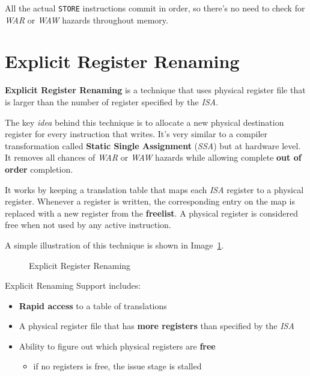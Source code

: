 \documentclass[english]{article}
\begin{document}
All the actual \texttt{STORE} instructions commit in order, so there's no need to check for \textit{WAR} or \textit{WAW} hazards throughout memory.

\newpage

\section{Explicit Register Renaming}

\textbf{Explicit Register Renaming} is a technique that uses physical register file that is larger than the number of register specified by the \textit{ISA}.

The key \textit{idea} behind this technique is to allocate a new physical destination register for every instruction that writes.
It's very similar to a compiler transformation called \textbf{Static Single Assignment} (\textit{SSA}) but at hardware level.
It removes all chances of \textit{WAR} or \textit{WAW} hazards while allowing complete \textbf{out of order} completion.

It works by keeping a translation table that maps each \textit{ISA} register to a physical register.
Whenever a register is written, the corresponding entry on the map is replaced with a new register from the \textbf{freelist}.
A physical register is considered free when not used by any active instruction.

A simple illustration of this technique is shown in Image~\ref{fig:explicit-register-renaming}.

\begin{figure}[htbp]
  \bigskip
  \centering
  \caption{Explicit Register Renaming}
  \label{fig:explicit-register-renaming}
  \bigskip
\end{figure}

Explicit Renaming Support includes:

\begin{itemize}
  \item \textbf{Rapid access} to a table of translations
  \item A physical register file that has \textbf{more registers} than specified by the \textit{ISA}
  \item Ability to figure out which physical registers are \textbf{free}
        \begin{itemize}
          \item if no registers is free, the issue stage is stalled
        \end{itemize}
\end{itemize}
\end{document}

